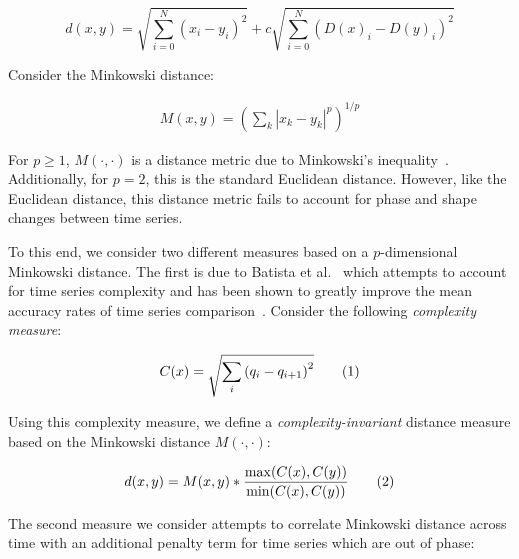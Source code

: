 \documentclass[a4paper]{article}
\newcommand\numberthis{\addtocounter{equation}{1}\tag{\theequation}}
\theoremstyle{def}
\theoremstyle{thm}
\begin{document}
\begin{equation}
    d(x,y) = \sqrt{\sum\limits_{i=0}^{N} (x_i - y_i)^2} + c\sqrt{\sum\limits_{i=0}^{N} ({D(x)}_i - {D(y)}_i)^2}
\end{equation}




\iffalse
Consider the Minkowski distance:

\begin{align}
    M(x,y) = {(\sum\limits_k |x_k - y_k|^p)}^{1/p}
\end{align}

For $p \ge 1$, $M(\cdot,\cdot)$ is a distance metric due to Minkowski's inequality~\cite[p. 190]{wheeden15-measure}.
Additionally, for $p = 2$, this is the standard Euclidean distance.
However, like the Euclidean distance, this distance metric fails to account for phase and shape changes between time series.

To this end, we consider two different measures based on a $p$-dimensional Minkowski distance.
The first is due to Batista et al.~\cite{batista14-cid} which attempts to account for time series complexity and has been shown to greatly improve the mean accuracy rates of time series comparison~\cite{giusti13-ecd}.
Consider the following \textit{complexity measure}:

\begin{align*}
    C(x) = \sqrt{\sum\limits_i {(q_i - q_{i+1})}^2} \numberthis
\end{align*}

Using this complexity measure, we define a \textit{complexity-invariant} distance measure based on the Minkowski distance $M(\cdot,\cdot)$:

\begin{align*}
    d(x,y) = M(x,y) * \frac{\max(C(x),C(y))}{\min(C(x),C(y))} \numberthis
\end{align*}

The second measure we consider attempts to correlate Minkowski distance across time with an additional penalty term for time series which are out of phase:
\end{document}
